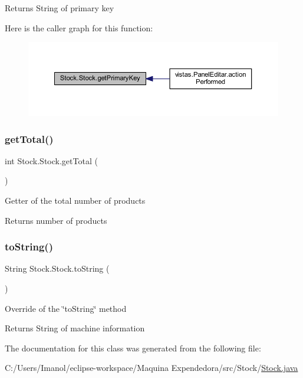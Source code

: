 \begin{DoxyReturn}{Returns}
String of primary key 
\end{DoxyReturn}
Here is the caller graph for this function\+:
\nopagebreak
\begin{figure}[H]
\begin{center}
\leavevmode
\includegraphics[width=350pt]{class_stock_1_1_stock_aaba40908c8c5d06d27e39c3f0c57ba07_icgraph}
\end{center}
\end{figure}
\mbox{\label{class_stock_1_1_stock_ad8b5a5604a4421296ab62e8e54817fdd}} 
\subsubsection{\texorpdfstring{get\+Total()}{getTotal()}}
{\footnotesize\ttfamily int Stock.\+Stock.\+get\+Total (\begin{DoxyParamCaption}{ }\end{DoxyParamCaption})}

Getter of the total number of products

\begin{DoxyReturn}{Returns}
number of products 
\end{DoxyReturn}
\mbox{\label{class_stock_1_1_stock_a19aa572f66461240db89edf002bec36e}} 
\subsubsection{\texorpdfstring{to\+String()}{toString()}}
{\footnotesize\ttfamily String Stock.\+Stock.\+to\+String (\begin{DoxyParamCaption}{ }\end{DoxyParamCaption})}

Override of the \char`\"{}to\+String\char`\"{} method \begin{DoxyReturn}{Returns}
String of machine information 
\end{DoxyReturn}


The documentation for this class was generated from the following file\+:\begin{DoxyCompactItemize}
\item 
C\+:/\+Users/\+Imanol/eclipse-\/workspace/\+Maquina Expendedora/src/\+Stock/\mbox{\hyperlink{_stock_8java}{Stock.\+java}}\end{DoxyCompactItemize}
